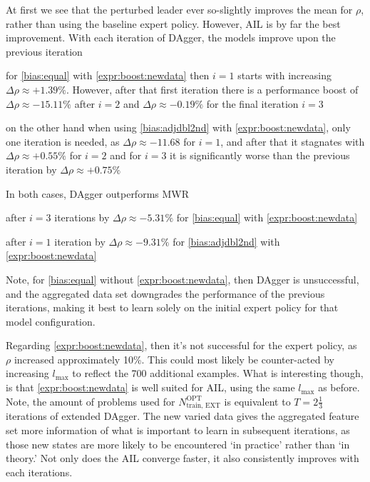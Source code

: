\documentclass[twocolumn]{svjour3}
\begin{document}
At first we see that the perturbed leader ever so-slightly improves the mean 
for $\rho$, rather than using the baseline expert policy. 
However, AIL is by far the best improvement. With each iteration of DAgger, the 
models improve upon the previous iteration
\begin{enumerate*} 
    \item for \ref{bias:equal} with \ref{expr:boost:newdata} then $i=1$ starts 
    with increasing $\Delta\rho\approx+1.39\%$. However, after that first  
    iteration there is a performance boost of $\Delta\rho\approx-15.11\%$ after 
    $i=2$ and $\Delta\rho\approx-0.19\%$ for the final iteration $i=3$
    \item on the other hand when using \ref{bias:adjdbl2nd} with 
    \ref{expr:boost:newdata}, only one iteration is needed, as 
    $\Delta\rho\approx-11.68$ for $i=1$, and after that it stagnates with 
    $\Delta\rho\approx+0.55\%$ for $i=2$ and for $i=3$ it is significantly 
    worse than the previous iteration by $\Delta\rho\approx+0.75\%$
\end{enumerate*}
In both cases, DAgger outperforms MWR
\begin{enumerate*}
    \item after $i=3$ iterations by $\Delta\rho\approx-5.31\%$ for 
    \ref{bias:equal} with \ref{expr:boost:newdata}
    \item after $i=1$ iteration by $\Delta\rho\approx-9.31\%$ for 
    \ref{bias:adjdbl2nd} with \ref{expr:boost:newdata}
\end{enumerate*}
Note, for \ref{bias:equal} without \ref{expr:boost:newdata}, then DAgger is 
unsuccessful, and the aggregated data set downgrades the performance of the 
previous iterations, making it best to learn solely on the initial expert 
policy for that model configuration.

Regarding \ref{expr:boost:newdata}, then it's not successful for the expert 
policy, as $\rho$ increased approximately 10\%. This could most likely be 
counter-acted by increasing $l_{\max}$ to reflect the 700 additional examples.
What is interesting though, is that \ref{expr:boost:newdata} is well suited for 
AIL, using the same $l_{\max}$ as before. 
Note, the amount of problems used for $N^{\text{OPT}}_{\text{train, EXT}}$ is equivalent to $T=2\tfrac{1}{3}$ iterations of extended DAgger.
The new varied data gives the aggregated feature set more information 
of what is important to learn in subsequent iterations, as those new states are 
more likely to be encountered `in practice' rather than `in theory.' Not only 
does the AIL converge faster, it also consistently 
improves with each iterations.
\end{document}
